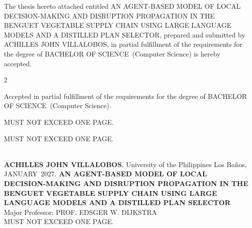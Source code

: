 \documentclass{icsthesis}
\renewcommand{\TITLE}{AN AGENT-BASED MODEL OF LOCAL DECISION-MAKING AND DISRUPTION PROPAGATION IN THE BENGUET VEGETABLE SUPPLY CHAIN USING LARGE LANGUAGE MODELS AND A DISTILLED PLAN SELECTOR}
\renewcommand{\AUTHOR}{ACHILLES JOHN  VILLALOBOS}
\renewcommand{\DEGREE}{BACHELOR OF SCIENCE}
\renewcommand{\MAJOR}{Computer Science}
\renewcommand{\MONTH}{JANUARY}
\renewcommand{\YEAR}{2027}
\begin{document}
	
	\begin{frontmatter}
		\maketitle
				
		\begin{approvalpage}
			The thesis hereto attached entitled \TITLE , prepared and submitted by \AUTHOR , in partial fulfillment of the requirements for the degree of \DEGREE\ (\MAJOR) is hereby accepted.
			
			\begin{multicols}{2}
				\centering
				\columnbreak
			\end{multicols}
			
			Accepted in partial fulfillment of the requirements for the degree of \DEGREE\ (\MAJOR). 
		\end{approvalpage}
		
		\begin{biosketch}
			\lipsum[4] %
			
			MUST NOT EXCEED ONE PAGE.		
			
			\addauthorsignaturefield
		\end{biosketch}	
		
		\begin{acknowledgement}
			\lipsum[4]
			\lipsum[4]
			\lipsum[4]
			MUST NOT EXCEED ONE PAGE.
		\end{acknowledgement}
		
		\maketableofcontents
		
		\makelistoftables

		\makelistoffigures
	
		
		\begin{abstractwithpageno}	
		\\
		\textbf{\AUTHOR}, University of the Philippines Los Ba\~{n}os, \MONTH\ \YEAR. \textbf{\TITLE}
		\\Major Professor: PROF. EDSGER W. DIJKSTRA\\
			
			\lipsum[4]MUST NOT EXCEED ONE PAGE.
		\end{abstractwithpageno}

	\end{frontmatter}
	
\end{document}
